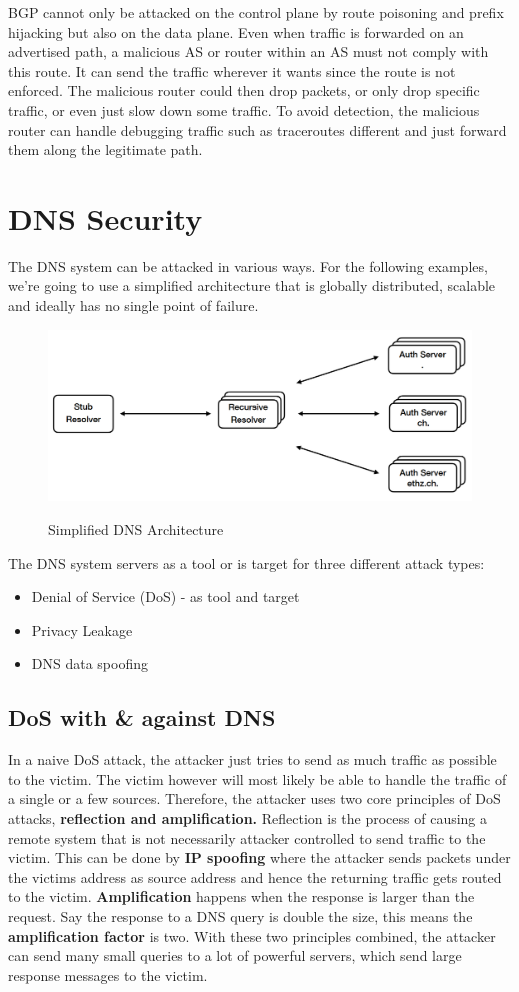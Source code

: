BGP cannot only be attacked on the control plane by route poisoning and prefix hijacking but also on the data plane. Even when traffic is forwarded on an advertised path, a malicious AS or router within an AS must not comply with this route. It can send the traffic wherever it wants since the route is not enforced. The malicious router could then drop packets, or only drop specific traffic, or even just slow down some traffic. To avoid detection, the malicious router can handle debugging traffic such as traceroutes different and just forward them along the legitimate path.


\section{DNS Security}
The DNS system can be attacked in various ways. For the following examples, we're going to use a simplified architecture that is globally distributed, scalable and ideally has no single point of failure.
\begin{figure}[H]
\centering
\includegraphics[width=.8\textwidth]{images/dns_architecture.PNG}
\label{dns_architecture}
\caption{Simplified DNS Architecture}
\end{figure}
The DNS system servers as a tool or is target for three different attack types:
\begin{itemize}
\item Denial of Service (DoS) - as tool and target
\item Privacy Leakage
\item DNS data spoofing
\end{itemize}

\subsection{DoS with \& against DNS}
In a naive DoS attack, the attacker just tries to send as much traffic as possible to the victim. The victim however will most likely be able to handle the traffic of a single or a few sources. Therefore, the attacker uses two core principles of DoS attacks, \textbf{reflection and amplification.} Reflection is the process of causing a remote system that is not necessarily attacker controlled to send traffic to the victim. This can be done by \textbf{IP spoofing} where the attacker sends packets under the victims address as source address and hence the returning traffic gets routed to the victim. \textbf{Amplification} happens when the response is larger than the request. Say the response to a DNS query is double the size, this means the \textbf{amplification factor} is two. With these two principles combined, the attacker can send many small queries to a lot of powerful servers, which send large response messages to the victim.

